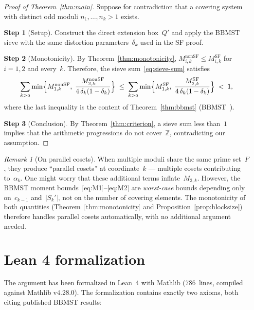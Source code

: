\documentclass[11pt]{amsart}
\theoremstyle{definition}
\theoremstyle{remark}
\newtheorem{remark}[theorem]{Remark}
\begin{document}
\begin{proof}[Proof of Theorem~\ref{thm:main}]
Suppose for contradiction that a covering system with distinct odd moduli
$n_1, \ldots, n_k > 1$ exists.

\smallskip
\noindent\textbf{Step 1} (Setup).
Construct the direct extension box~$Q'$ and apply the BBMST sieve
with the same distortion parameters~$\delta_k$ used in the SF proof.

\smallskip
\noindent\textbf{Step 2} (Monotonicity).
By Theorem~\ref{thm:monotonicity}, $M_{i,k}^{\mathrm{nonSF}} \le M_{i,k}^{\mathrm{SF}}$
for $i = 1, 2$ and every~$k$. Therefore, the sieve
sum~\eqref{eq:sieve-sum} satisfies
\[
  \sum_{k > a}
  \min\Bigl\{M_{1,k}^{\mathrm{nonSF}},\;
  \frac{M_{2,k}^{\mathrm{nonSF}}}{4\,\delta_k(1-\delta_k)}\Bigr\}
  \;\le\;
  \sum_{k > a}
  \min\Bigl\{M_{1,k}^{\mathrm{SF}},\;
  \frac{M_{2,k}^{\mathrm{SF}}}{4\,\delta_k(1-\delta_k)}\Bigr\}
  \;<\; 1,
\]
where the last inequality is the content of Theorem~\ref{thm:bbmst}
(BBMST~\cite{BBMST2019}).

\smallskip
\noindent\textbf{Step 3} (Conclusion).
By Theorem~\ref{thm:criterion}, a sieve sum less than~$1$ implies
that the arithmetic progressions do not cover~$\mathbb{Z}$,
contradicting our assumption.
\end{proof}

\begin{remark}[On parallel cosets]
When multiple moduli share the same prime set~$F$, they produce
``parallel cosets'' at coordinate~$k$ --- multiple cosets contributing
to~$\alpha_k$.
One might worry that these additional terms inflate~$M_{2,k}$.
However, the BBMST moment bounds~\eqref{eq:M1}--\eqref{eq:M2}
are \emph{worst-case} bounds depending only on~$c_{k-1}$ and~$|S_k'|$,
not on the number of covering elements.
The monotonicity of both quantities (Theorem~\ref{thm:monotonicity}
and Proposition~\ref{prop:blocksize}) therefore handles parallel
cosets automatically, with no additional argument needed.
\end{remark}

\section{Lean 4 formalization}\label{sec:lean}

The argument has been formalized in Lean~4 with Mathlib
(786~lines, compiled against Mathlib v4.28.0).
The formalization contains exactly two axioms, both citing
published BBMST results:
\end{document}
